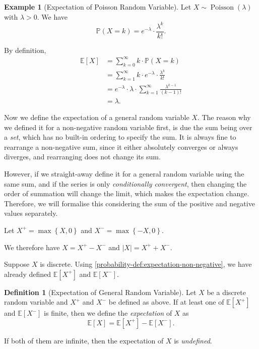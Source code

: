 \documentclass[11pt]{article}
\numberwithin{equation}{section}
\theoremstyle{definition}
\newtheorem{definition}[theorem]{Definition}
\newtheorem{example}[theorem]{Example}
\theoremstyle{remark}
\newcommand{\pqty}[1]{\left(#1\right)}
\newcommand{\bqty}[1]{\left[#1\right]}
\newcommand{\Bqty}[1]{\left\{#1\right\}}
\newcommand{\abs}[1]{\left|#1\right|}
\newcommand{\Prob}{\mathbb P}
\newcommand{\Expt}{\mathbb E}
\newcommand{\Poisson}{\operatorname{Poisson}}
\begin{document}
\begin{example}[Expectation of Poisson Random Variable]\label{probability-example-021}
    \label{probability-ex:expectation-poisson}%
    Let \(X \sim \Poisson\pqty{\lambda}\) with \(\lambda > 0\). We have
    \[
        \Prob\pqty{X = k} = e^{-\lambda} \cdot \frac{\lambda^k}{k!}.
    \]

    By definition,
    \begin{align*}
        \Expt\bqty{X} &= \sum_{k = 0}^{\infty} k \cdot \Prob\pqty{X = k} \\
        &= \sum_{k = 1}^{\infty} k \cdot e^{-\lambda} \cdot \frac{\lambda^k}{k!} \\
        &= e^{-\lambda} \cdot \lambda \cdot \sum_{k = 1}^{\infty} \frac{\lambda^{k - 1}}{\pqty{k - 1}!} \\
        &=\lambda.
    \end{align*}
\end{example}

Now we define the expectation of a general random variable \(X\). The reason why we defined it for a non-negative random variable first, is due the sum being over a \emph{set}, which has no built-in ordering to specify the sum. It is always fine to rearrange a non-negative sum, since it either absolutely converges or always diverges, and rearranging does not change its sum.

However, if we straight-away define it for a general random variable using the same sum, and if the series is only \emph{conditionally convergent}, then changing the order of summation will change the limit, which makes the expectation change. Therefore, we will formalise this considering the sum of the positive and negative values separately.

Let \(X^+ = \max\Bqty{X, 0}\) and \(X^- = \max\Bqty{-X, 0}\).

We therefore have \(X = X^+ - X^-\) and \(\abs{X} = X^+ + X^-\).

Suppose \(X\) is discrete. Using \autoref{probability-def:expectation-non-negative}, we have already defined \(\Expt\bqty{X^+}\) and \(\Expt\bqty{X^-}\).

\begin{definition}[Expectation of General Random Variable]\label{probability-definition-024}
    \label{probability-def:expectation-general-random-variable}%
    Let \(X\) be a discrete random variable and \(X^+\) and \(X^-\) be defined as above. If at least one of \(\Expt\bqty{X^+}\) and \(\Expt\bqty{X^-}\) is finite, then we define the \emph{expectation} of \(X\) as
    \[
        \Expt\bqty{X} = \Expt\bqty{X^+} - \Expt\bqty{X^-}.
    \]

    If both of them are infinite, then the expectation of \(X\) is \emph{undefined}.
\end{definition}
\end{document}
